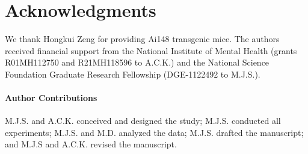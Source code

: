 \section{Acknowledgments}
We thank Hongkui Zeng for providing Ai148 transgenic mice. The authors received financial support from the National Institute of Mental Health (grants R01MH112750 and R21MH118596 to A.C.K.) and the National Science Foundation Graduate Research Fellowship (DGE-1122492 to M.J.S.).

\paragraph{Author Contributions} M.J.S. and A.C.K. conceived and designed the study; M.J.S. conducted all experiments; M.J.S. and M.D. analyzed the data; M.J.S. drafted the manuscript; and M.J.S and A.C.K. revised the manuscript.
